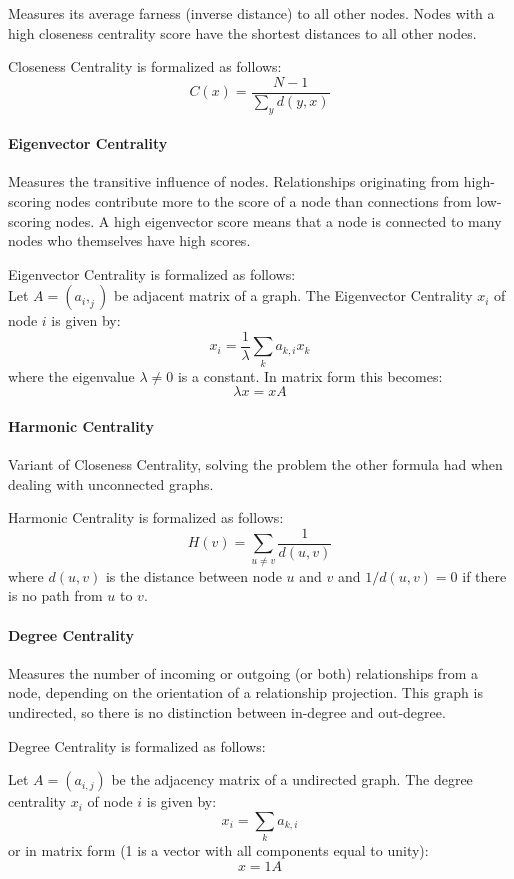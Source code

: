 \documentclass[10pt,twocolumn,letterpaper]{article}
\begin{document}
Measures its average farness (inverse distance) to all other nodes. Nodes with a high closeness centrality score have the shortest distances to all other nodes.

Closeness Centrality is formalized as follows:
$$
C(x)=\frac{N-1}{\sum_{y} d(y, x)}
$$

\paragraph{Eigenvector Centrality}

Measures the transitive influence of nodes. Relationships originating from high-scoring nodes contribute more to the score of a node than connections from low-scoring nodes. A high eigenvector score means that a node is connected to many nodes who themselves have high scores.

Eigenvector Centrality is formalized as follows: \\

Let $A=(a_i,_j)$ be adjacent matrix of a graph. The Eigenvector Centrality $x_i$ of node $i$ is given by:
$$
x_{i}=\frac{1}{\lambda} \sum_{k} a_{k, i} x_{k}
$$
where the eigenvalue $\lambda \neq 0$ is a constant. In matrix form this becomes:
$$
\lambda x=x A
$$

\paragraph{Harmonic Centrality}

Variant of Closeness Centrality, solving the problem the other formula had when dealing with unconnected graphs.

Harmonic Centrality is formalized as follows:
$$
H(v)=\sum_{u \neq v} \frac{1}{d(u, v)}
$$
where $d(u, v)$ is the distance between node $u$ and $v$ and $1 / d(u, v)=0$ if there is no path from $u$ to $v$.

\paragraph{Degree Centrality}

Measures the number of incoming or outgoing (or both) relationships from a node, depending on the orientation of a relationship projection. This graph is undirected, so there is no distinction between in-degree and out-degree.

Degree Centrality is formalized as follows:

Let $A=\left(a_{i, j}\right)$ be the adjacency matrix of a undirected graph. The degree centrality $x_{i}$ of node $i$ is given by:
$$
x_{i}=\sum_{k} a_{k, i}
$$
or in matrix form (1 is a vector with all components equal to unity):
$$
x=1 A
$$
\end{document}
